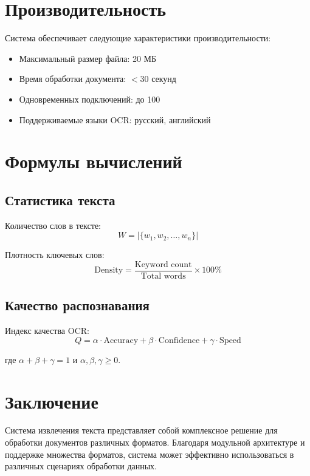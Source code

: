 \documentclass[12pt,a4paper]{article}
\begin{document}
\section{Производительность}

Система обеспечивает следующие характеристики производительности:

\begin{itemize}
    \item Максимальный размер файла: 20 МБ
    \item Время обработки документа: $< 30$ секунд
    \item Одновременных подключений: до 100
    \item Поддерживаемые языки OCR: русский, английский
\end{itemize}

\section{Формулы вычислений}

\subsection{Статистика текста}

Количество слов в тексте:
\[
W = |\{w_1, w_2, \ldots, w_n\}|
\]

Плотность ключевых слов:
\[
\text{Density} = \frac{\text{Keyword count}}{\text{Total words}} \times 100\%
\]

\subsection{Качество распознавания}

Индекс качества OCR:
\[
Q = \alpha \cdot \text{Accuracy} + \beta \cdot \text{Confidence} + \gamma \cdot \text{Speed}
\]

где $\alpha + \beta + \gamma = 1$ и $\alpha, \beta, \gamma \geq 0$.

\section{Заключение}

Система извлечения текста представляет собой комплексное решение для обработки документов различных форматов. Благодаря модульной архитектуре и поддержке множества форматов, система может эффективно использоваться в различных сценариях обработки данных.
\end{document}
